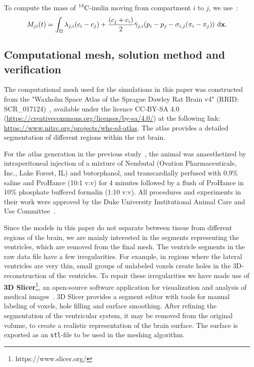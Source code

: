 \documentclass[10pt]{article}
\newcommand{\1}{^{(1)}}
\newcommand{\2}{^{(2)}}
\newcommand*{\dd}{\mathop{\kern0pt\mathrm{d}}\!{}}
\newcommand {\x}   {\mathbf{x}}
\newcommand{\Cinulin}{$\prescript{14}{}{\text{C}}$-inulin }
\begin{document}
To compute the mass of \Cinulin moving from compartment $i$ to $j$, we use~\cite{jarzynska2006application}: 
\begin{equation}
    M_{ji}(t) = \int_\Omega  \lambda_{j, i}( c_i- c_j) +  \frac{(c_j+c_i)}{2} \tilde \gamma_{j , i} (p_i - p_j-\sigma_{i,j}(\pi_i-\pi_j))  \, \dd \x.
    \label{eq:matrixM}
\end{equation}
\subsection{Computational mesh, solution method and verification} \label{section: mesh}
The computational mesh used for the simulations in this paper was constructed from the "Waxholm Space Atlas of the Sprague Dawley Rat Brain v4" (RRID: \textsf{SCR\_017124})~\cite{papp2014, atlasv4}, available under the licence CC-BY-SA 4.0 (\url{https://creativecommons.org/licenses/by-sa/4.0/}) at the following link: \url{https://www.nitrc.org/projects/whs-sd-atlas}. The atlas provides a detailed segmentation of different regions within the rat brain. 

For the atlas generation in the previous study~\cite{papp2014}, the animal was anaesthetized by intraperitoneal injection of a mixture of Nembutal (Ovation Pharmaceuticals, Inc., Lake Forest, IL) and butorphanol, and transcardially perfused with 0.9\% saline and ProHance (10:1 v:v) for 4 minutes followed by a flush of ProHance in 10\% phosphate buffered formalin (1:10 v:v). All procedures and experiments in their work were approved by the Duke University Institutional Animal Care and Use Committee~\cite{papp2014}.

Since the models in this paper do not separate between tissue from different regions of the brain, we are mainly interested in the segments representing the ventricles, which are removed from the final mesh. The ventricle segments in the raw data file have a few irregularities. For example, in regions where the lateral ventricles are very thin, small groups of unlabeled voxels create holes in the 3D-reconstruction of the ventricles. To repair these irregularities we have made use of \textbf{3D Slicer}\footnote{https://www.slicer.org/}, an open-source software application for visualization and analysis of medical images~\cite{fedorov2012}. 3D Slicer provides a segment editor with tools for manual labeling of voxels, hole filling and surface smoothing. After refining the segmentation of the ventricular system, it may be removed from the original volume, to create a realistic representation of the brain surface. The surface is exported as an \texttt{stl}-file to be used in the meshing algorithm.  
\end{document}
